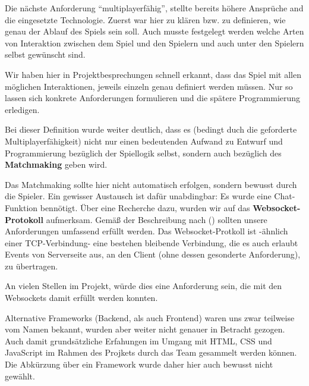 Die nächste Anforderung \enquote{multiplayerfähig}, stellte bereits höhere Ansprüche and die eingesetzte Technologie. Zuerst war hier zu klären bzw. zu definieren, wie genau der Ablauf des Spiels sein soll. Auch musste festgelegt werden welche Arten von Interaktion zwischen dem Spiel und den Spielern und auch unter den Spielern selbst gewünscht sind. 

Wir haben hier in Projektbesprechungen schnell erkannt, dass das Spiel mit allen möglichen Interaktionen, jeweils einzeln genau definiert werden müssen. Nur so lassen sich konkrete Anforderungen formulieren und die spätere Programmierung erledigen. 

Bei dieser Definition wurde weiter deutlich, dass es (bedingt duch die geforderte Multiplayerfähigkeit) nicht nur einen bedeutenden Aufwand zu Entwurf und Programmierung bezüglich der Spiellogik selbst, sondern auch bezüglich des \textbf{\gls{Matchmaking}} geben wird. 

Das \gls{Matchmaking} sollte hier nicht automatisch erfolgen, sondern bewusst durch die Spieler. Ein gewisser Austausch ist dafür unabdingbar: Es wurde eine Chat-Funktion bennötigt. Über eine Recherche dazu, wurden wir auf das \textbf{Websocket-Protokoll} aufmerksam. Gemäß der Beschreibung nach \citeauthor{heise-django-2011} (\citeyear{heise-django-2011}) sollten unsere Anforderungen umfassend erfüllt werden. Das Websocket-Protkoll ist -ähnlich einer TCP-Verbindung- eine bestehen bleibende Verbindung, die es auch erlaubt Events von Serverseite aus, an den Client (ohne dessen gesonderte Anforderung), zu übertragen. 

An vielen Stellen im Projekt, würde dies eine Anforderung sein, die mit den Websockets damit erfüllt werden konnten. 

Alternative Frameworks (Backend, als auch Frontend) waren uns zwar teilweise vom Namen bekannt, wurden aber weiter nicht genauer in Betracht gezogen. Auch damit grundsätzliche Erfahungen im Umgang mit HTML, CSS und JavaScript im Rahmen des Projkets durch das Team gesammelt werden können. Die Abkürzung über ein Framework wurde daher hier auch bewusst nicht gewählt. 

